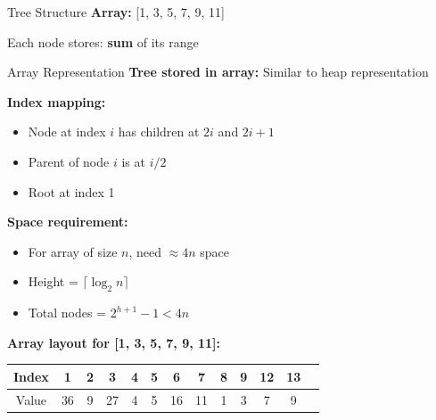 \documentclass[aspectratio=169]{beamer}
\begin{document}
\begin{frame}{Tree Structure}
  \textbf{Array:} [1, 3, 5, 7, 9, 11]

  \begin{center}
  \end{center}

  \vspace{0.3cm}
  \small
  Each node stores: \textbf{sum} of its range
\end{frame}

\begin{frame}{Array Representation}
  \textbf{Tree stored in array:} Similar to heap representation

  \vspace{0.3cm}
  \textbf{Index mapping:}
  \begin{itemize}
    \item Node at index $i$ has children at $2i$ and $2i+1$
    \item Parent of node $i$ is at $i/2$
    \item Root at index 1
  \end{itemize}

  \vspace{0.5cm}
  \textbf{Space requirement:}
  \begin{itemize}
    \item For array of size $n$, need $\approx 4n$ space
    \item Height = $\lceil \log_2 n \rceil$
    \item Total nodes = $2^{h+1} - 1 < 4n$
  \end{itemize}

  \vspace{0.5cm}
  \textbf{Array layout for [1, 3, 5, 7, 9, 11]:}
  \begin{center}
    \small
    \begin{tabular}{|c|c|c|c|c|c|c|c|c|c|c|c|c|}
      \hline
      Index & 1 & 2 & 3 & 4 & 5 & 6 & 7 & 8 & 9 & 12 & 13 \\
      \hline
      Value & 36 & 9 & 27 & 4 & 5 & 16 & 11 & 1 & 3 & 7 & 9 \\
      \hline
    \end{tabular}
  \end{center}
\end{frame}
\end{document}
